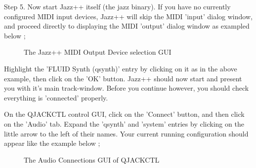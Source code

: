 \documentclass[letterpaper]{report}
\begin{document}
Step 5. Now start Jazz++ itself (the jazz binary). If you have no 
currently configured MIDI input devices, Jazz++ will skip the MIDI 'input'
dialog window, and proceed directly to displaying  the MIDI 'output'
dialog window as exampled below ;



\begin{figure}
\caption{The Jazz++ MIDI Output Device selection GUI}
\end{figure}



Highlight the 'FLUID Synth (qsynth)' entry by clicking on it as in the
above example, then click on the 'OK' button. Jazz++ should now start
and present you with it's main track-window. Before you continue however,
you should check everything is 'connected' properly.

On the QJACKCTL control GUI, click on the 'Connect' button, and then
click on the 'Audio' tab. Expand the 'qsynth' and 'system' entries by
clicking on the little arrow to the left of their names. Your current
running configuration should appear like the example below ;



\begin{figure}
\caption{The Audio Connections GUI of QJACKCTL}
\end{figure}
\end{document}

